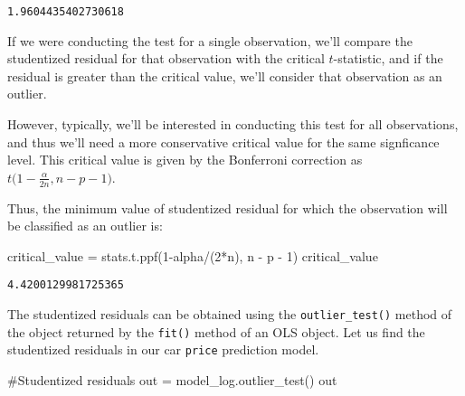 \documentclass[
  letterpaper,
  DIV=11,
  numbers=noendperiod]{scrreprt}
\newenvironment{Shaded}{\begin{snugshade}}{\end{snugshade}}
\newcommand{\CommentTok}[1]{\textcolor[rgb]{0.37,0.37,0.37}{#1}}
\newcommand{\DecValTok}[1]{\textcolor[rgb]{0.68,0.00,0.00}{#1}}
\newcommand{\NormalTok}[1]{\textcolor[rgb]{0.00,0.23,0.31}{#1}}
\newcommand{\OperatorTok}[1]{\textcolor[rgb]{0.37,0.37,0.37}{#1}}
\begin{document}
\begin{verbatim}
1.9604435402730618
\end{verbatim}

If we were conducting the test for a single observation, we'll compare
the studentized residual for that observation with the critical
\(t\)-statistic, and if the residual is greater than the critical value,
we'll consider that observation as an outlier.

However, typically, we'll be interested in conducting this test for all
observations, and thus we'll need a more conservative critical value for
the same signficance level. This critical value is given by the
Bonferroni correction as
\(t\big(1 - \frac{\alpha}{2n}, n - p - 1\big)\).

Thus, the minimum value of studentized residual for which the
observation will be classified as an outlier is:

\begin{Shaded}
\begin{Highlighting}[]
\NormalTok{critical\_value }\OperatorTok{=}\NormalTok{ stats.t.ppf(}\DecValTok{1}\OperatorTok{{-}}\NormalTok{alpha}\OperatorTok{/}\NormalTok{(}\DecValTok{2}\OperatorTok{*}\NormalTok{n), n }\OperatorTok{{-}}\NormalTok{ p }\OperatorTok{{-}} \DecValTok{1}\NormalTok{)}
\NormalTok{critical\_value}
\end{Highlighting}
\end{Shaded}

\begin{verbatim}
4.4200129981725365
\end{verbatim}

The studentized residuals can be obtained using the
\texttt{outlier\_test()} method of the object returned by the
\texttt{fit()} method of an OLS object. Let us find the studentized
residuals in our car \texttt{price} prediction model.

\begin{Shaded}
\begin{Highlighting}[]
\CommentTok{\#Studentized residuals}
\NormalTok{out }\OperatorTok{=}\NormalTok{ model\_log.outlier\_test()}
\NormalTok{out}
\end{Highlighting}
\end{Shaded}
\end{document}
